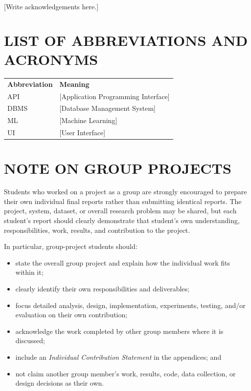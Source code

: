 \documentclass[12pt,a4paper]{report}
\begin{document}
[Write acknowledgements here.]

\clearpage

\tableofcontents
\clearpage

\listoffigures
\clearpage

\listoftables
\clearpage

\chapter*{LIST OF ABBREVIATIONS AND ACRONYMS}

\begin{longtable}{p{}p{}}
\textbf{Abbreviation} & \textbf{Meaning}\\
API & [Application Programming Interface]\\
DBMS & [Database Management System]\\
ML & [Machine Learning]\\
UI & [User Interface]\\
\end{longtable}

\clearpage


\chapter*{NOTE ON GROUP PROJECTS}

Students who worked on a project as a group are strongly encouraged to prepare their own individual final reports rather than submitting identical reports. The project, system, dataset, or overall research problem may be shared, but each student's report should clearly demonstrate that student's own understanding, responsibilities, work, results, and contribution to the project.

In particular, group-project students should:

\begin{itemize}
    \item state the overall group project and explain how the individual work fits within it;
    \item clearly identify their own responsibilities and deliverables;
    \item focus detailed analysis, design, implementation, experiments, testing, and/or evaluation on their own contribution;
    \item acknowledge the work completed by other group members where it is discussed;
    \item include an \emph{Individual Contribution Statement} in the appendices; and
    \item not claim another group member's work, results, code, data collection, or design decisions as their own.
\end{itemize}
\end{document}
